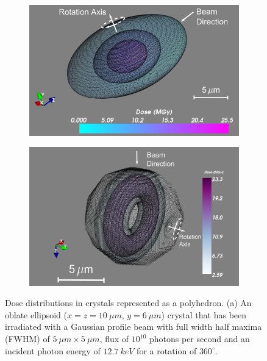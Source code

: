         \begin{figure}
            \centering
            \begin{subfigure}[b]{0.463\textwidth}
                    \centering
                    \includegraphics[width=\textwidth]{figures/introduction/ellipsoidcrystal.pdf}
                    \caption{}
                    \label{fig:Ellipsoidal crystal}
            \end{subfigure}
            \quad
            \begin{subfigure}[b]{0.437\textwidth}
                    \centering
                    \includegraphics[width=\textwidth]{figures/introduction/IcoCrystalEdges.pdf}
                    \caption{}
                    \label{fig:Icosohedral crystal}
            \end{subfigure}
            \caption{Dose distributions in crystals represented as a polyhedron. (a) An oblate ellipsoid ($x = z = 10\ \mu m$, $y = 6\ \mu m$) crystal that has been irradiated with a Gaussian profile beam with full width half maxima (FWHM) of $5\ \mu m \times 5\ \mu m$, flux of $10^{10}$ photons per second and an incident photon energy of $12.7\ keV$ for a rotation of $360^{\circ}$.
}
\end{figure}
